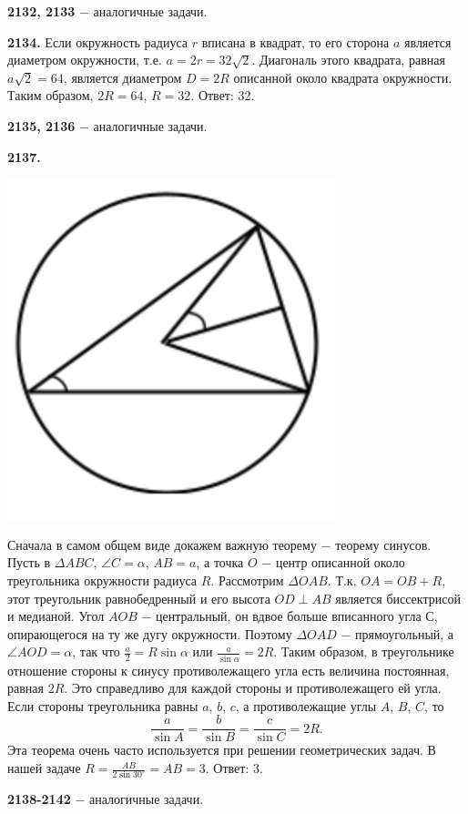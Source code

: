 \textbf{2132, 2133} $-$ аналогичные задачи.

\textbf{2134.} Если окружность радиуса $r$ вписана в  квадрат, то его сторона $a$ является диаметром окружности, т.е. $a=2r=32\sqrt{2}$. Диагональ этого квадрата, равная $a\sqrt{2}=64$, является диаметром $D=2R$ описанной около квадрата окружности. Таким образом, $2R=64$, $R=32$. \newline \null \hspace*{\fill} Ответ: 32.

\textbf{2135, 2136} $-$ аналогичные задачи.

\textbf{2137.}

{\centering \includegraphics[width=0.4\linewidth]{Geometry/Content/42.png}
	
}

Сначала в самом общем виде докажем важную теорему $-$ теорему синусов.  Пусть в $\Delta ABC$, $\angle C = \alpha$, $AB=a$, а точка $O$ $-$ центр описанной около треугольника окружности радиуса $R$. Рассмотрим $\Delta OAB$. Т.к. $OA=OB+R$, этот треугольник равнобедренный и его высота $OD \perp AB$ является биссектрисой и медианой. Угол $AOB$ $-$ центральный, он вдвое больше вписанного угла $С$, опирающегося на ту же дугу окружности. Поэтому $\Delta OAD$ $-$ прямоугольный, а $\angle AOD=\alpha$, так что $\frac{a}{2}=R\sin{\alpha}$ или $\frac{a}{\sin{\alpha}}=2R$. Таким образом, в треугольнике отношение стороны к синусу противолежащего угла есть величина постоянная, равная $2R$. Это справедливо для  каждой стороны и противолежащего ей угла. Если стороны треугольника равны $a$, $b$, $c$, а противолежащие углы $A$, $B$, $C$, то 
\[
\frac{a}{\sin{A}}=\frac{b}{\sin{B}}=\frac{c}{\sin{C}}=2R.
\]
Эта теорема очень часто используется при решении геометрических задач. В нашей задаче $R = \frac{AB}{2\sin{30^\circ}}=AB=3$. \newline \null \hspace*{\fill} Ответ: 3.

\textbf{2138-2142} $-$ аналогичные задачи.

